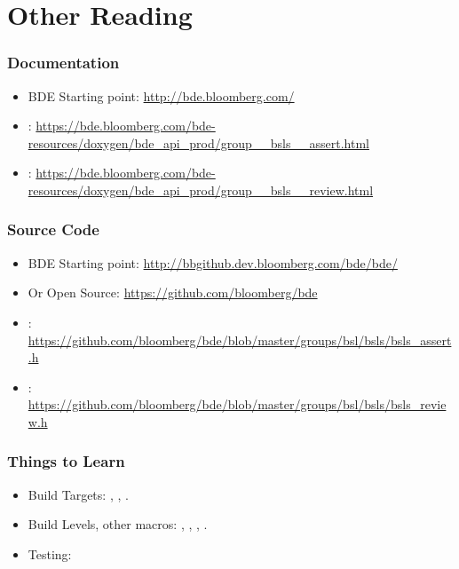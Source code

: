 \section{Other Reading}

\begin{frame}[fragile]
  \frametitle{Documentation}
  \begin{itemize}
  \item{BDE Starting point: \url{http://bde.bloomberg.com/} } \pause
  \item{: \url{https://bde.bloomberg.com/bde-resources/doxygen/bde_api_prod/group__bsls__assert.html} } \pause
  \item{: \url{https://bde.bloomberg.com/bde-resources/doxygen/bde_api_prod/group__bsls__review.html} } 
  \end{itemize}
\end{frame}
  
\begin{frame}[fragile]
  \frametitle{Source Code}
  \begin{itemize}
  \item{BDE Starting point: \url{http://bbgithub.dev.bloomberg.com/bde/bde/} } \pause
  \item{Or Open Source: \url{https://github.com/bloomberg/bde} } \pause
  \item{: \url{https://github.com/bloomberg/bde/blob/master/groups/bsl/bsls/bsls_assert.h} } \pause
  \item{: \url{https://github.com/bloomberg/bde/blob/master/groups/bsl/bsls/bsls_review.h} } 
  \end{itemize}
\end{frame}
  
\begin{frame}[fragile]
  \frametitle{Things to Learn}
  \begin{itemize}
  \item{Build Targets: , , .} \pause
  \item{Build Levels, other macros: , , , .} \pause
  \item{Testing:  } 
  \end{itemize}
\end{frame}
  
